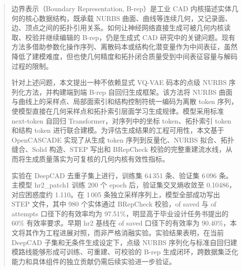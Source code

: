 
\begin{abstract}
    边界表示（Boundary Representation, B-rep）是工业 CAD 内核描述实体几何的核心数据结构，既承载 NURBS 曲面、曲线等连续几何，又记录面、边、顶点之间的拓扑引用关系。如何让神经网络直接生成可被几何内核读取、校验并继续编辑的 B-rep，仍是生成式 CAD 研究中的关键问题。现有方法多借助参数化操作序列、离散码本或结构化潜变量作为中间表征，虽然降低了建模难度，但也使几何精度和拓扑闭合质量受到中间表征容量与解码过程的限制。

    针对上述问题，本文提出一种不依赖显式 VQ-VAE 码本的点级 NURBS 序列化方法，并构建端到端 B-rep 自回归生成框架。该方法将 NURBS 曲面与曲线上的采样点、局部面索引和结构控制符统一编码为离散 token 序列，使模型直接在几何采样点和拓扑索引层面学习生成规律。模型采用标准 next-token 自回归 Transformer，对序列中的坐标 token、拓扑索引 token 和结构 token 进行联合建模。为评估生成结果的工程可用性，本文基于 OpenCASCADE 实现了从生成 token 序列到反量化、NURBS 拟合、拓扑缝合、Solid 构造、STEP 写出和 BRepCheck 校验的完整重建流水线，从而将生成质量落实为可复核的几何内核有效性指标。

    实验在 DeepCAD 去重子集上进行，训练集 64\,351 条、验证集 6\,096 条。主模型 hr2\_patch1 训练 200 个 epoch 后，验证集交叉熵收敛至 0.10486，对应困惑度约 1.110。在 1\,005 条独立采样序列上，模型全部成功写出 STEP 文件，其中 980 个实体通过 BRepCheck 校验，of saved 与 of attempts 口径下的有效率均为 97.51\%，明显高于毕业设计任务书提出的 60\% 有效率要求。早期 hr2 基线在 of saved 口径下的有效率为 90.40\%，本文将其作为工程进展对照，而非严格消融实验。实验结果表明，在当前 DeepCAD 子集和无条件生成设定下，点级 NURBS 序列化与标准自回归建模路线能够形成可训练、可重建、可校验的 B-rep 生成闭环，跨数据集泛化能力和具体组件的独立贡献仍需后续实验进一步验证。
\end{abstract}

